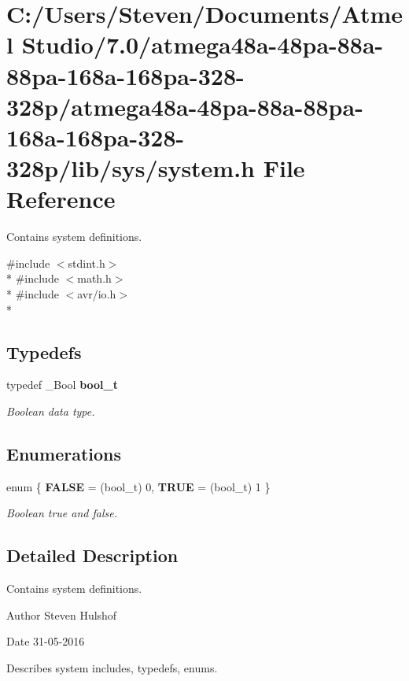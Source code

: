 \section{C\+:/\+Users/\+Steven/\+Documents/\+Atmel Studio/7.0/atmega48a-\/48pa-\/88a-\/88pa-\/168a-\/168pa-\/328-\/328p/atmega48a-\/48pa-\/88a-\/88pa-\/168a-\/168pa-\/328-\/328p/lib/sys/system.h File Reference}
\label{system_8h}


Contains system definitions.  


{\ttfamily \#include $<$stdint.\+h$>$}\\*
{\ttfamily \#include $<$math.\+h$>$}\\*
{\ttfamily \#include $<$avr/io.\+h$>$}\\*
\subsection*{Typedefs}
\begin{DoxyCompactItemize}
\item 
typedef \+\_\+\+Bool {\bf bool\+\_\+t}\label{system_8h_a9d1c1dc81799d49e2348821d6a8cac63}

\begin{DoxyCompactList}\small\item\em Boolean data type. \end{DoxyCompactList}\end{DoxyCompactItemize}
\subsection*{Enumerations}
\begin{DoxyCompactItemize}
\item 
enum \{ {\bfseries F\+A\+L\+SE} = (bool\+\_\+t) 0, 
{\bfseries T\+R\+UE} = (bool\+\_\+t) 1
 \}\label{system_8h_a99fb83031ce9923c84392b4e92f956b5}
\begin{DoxyCompactList}\small\item\em Boolean true and false. \end{DoxyCompactList}
\end{DoxyCompactItemize}


\subsection{Detailed Description}
Contains system definitions. 

\begin{DoxyAuthor}{Author}
Steven Hulshof
\end{DoxyAuthor}
\begin{DoxyDate}{Date}
31-\/05-\/2016
\end{DoxyDate}
Describes system includes, typedefs, enums. 